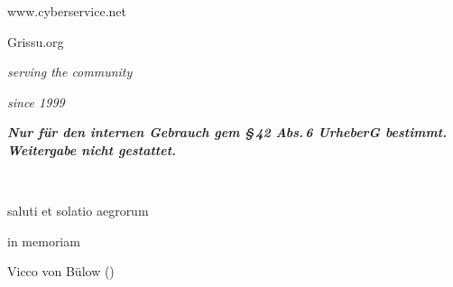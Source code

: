 \documentclass[
ngerman,
paper=a4,
asymmetric,
fontsize=9pt,
draft=false,
openany,
numbers=noenddot,
bibtotocnumbered,
footnotes=multiple,
toc=flat,
]{scrbook}
\begin{document}
\begin{titlepage}
\begin{WidePar}
\begin{minipage}{8cm}
\begin{center}
        {\sffamily{}www.cyberservice.net}\par\vspace{2em}
    
        {\Huge Grissu.org}\par\vspace{1em}
        \textit{serving the community} \par \textit{since 1999} 
    \end{center}
    \end{minipage}
    \vspace{2em}
    \begin{center}
        {\bfseries\itshape Nur für den internen Gebrauch gem §\,42 Abs.\,6
        UrheberG bestimmt. Weitergabe nicht gestattet.}
    \end{center}
    
    \end{WidePar}

\clearpage
\thispagestyle{empty}

~
\vspace{3cm}

\begin{center}
saluti et solatio aegrorum
\end{center}



\bigskip

\bigskip

\bigskip

\bigskip

\bigskip

\bigskip

\bigskip

\bigskip

\bigskip

\bigskip


\vfill

\begin{center}

\bigskip

\bigskip

in memoriam

Vicco von Bülow ()


\vspace{3cm}

\end{center}

\end{titlepage}
\end{document}
